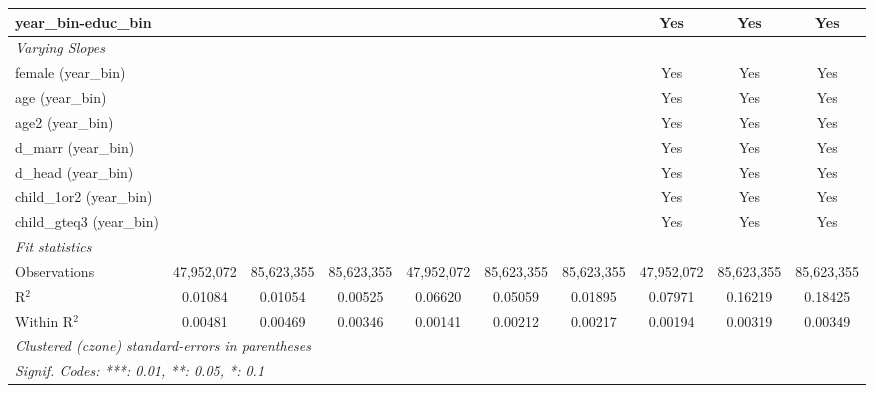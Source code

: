 \begin{tabular}{lccccccccc}
year\_bin-educ\_bin &  &  &  &  &  &  & Yes & Yes & Yes\\
\midrule \emph{Varying Slopes}&   &   &   &   &   &   &   &   &  \\
female (year\_bin) &  &  &  &  &  &  & Yes & Yes & Yes\\
age (year\_bin) &  &  &  &  &  &  & Yes & Yes & Yes\\
age2 (year\_bin) &  &  &  &  &  &  & Yes & Yes & Yes\\
d\_marr (year\_bin) &  &  &  &  &  &  & Yes & Yes & Yes\\
d\_head (year\_bin) &  &  &  &  &  &  & Yes & Yes & Yes\\
child\_1or2 (year\_bin) &  &  &  &  &  &  & Yes & Yes & Yes\\
child\_gteq3 (year\_bin) &  &  &  &  &  &  & Yes & Yes & Yes\\
\midrule \emph{Fit statistics}&  & & & & & & & & \\
Observations & 47,952,072&85,623,355&85,623,355&47,952,072&85,623,355&85,623,355&47,952,072&85,623,355&85,623,355\\
R$^2$ & 0.01084&0.01054&0.00525&0.06620&0.05059&0.01895&0.07971&0.16219&0.18425\\
Within R$^2$ & 0.00481&0.00469&0.00346&0.00141&0.00212&0.00217&0.00194&0.00319&0.00349\\
\midrule\midrule\multicolumn{10}{l}{\emph{Clustered (czone) standard-errors in parentheses}}\\
\multicolumn{10}{l}{\emph{Signif. Codes: ***: 0.01, **: 0.05, *: 0.1}}\\
\end{tabular}


